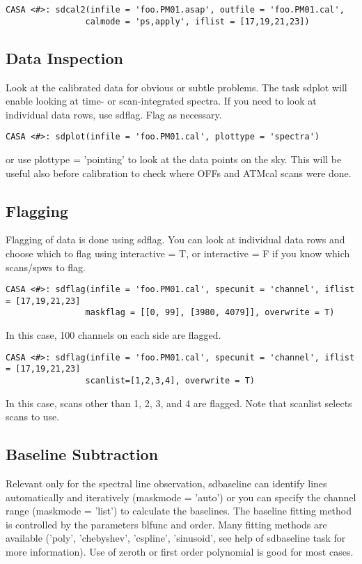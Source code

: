 \begin{verbatim}
CASA <#>: sdcal2(infile = 'foo.PM01.asap', outfile = 'foo.PM01.cal', 
                calmode = 'ps,apply', iflist = [17,19,21,23])
\end{verbatim}


\subsection{Data Inspection}
Look at the calibrated data for obvious or subtle problems. 
The task sdplot will enable looking at time- or scan-integrated spectra. 
If you need to look at individual data rows, use sdflag. Flag as 
necessary.

\begin{verbatim}
CASA <#>: sdplot(infile = 'foo.PM01.cal', plottype = 'spectra')
\end{verbatim}
or use plottype = 'pointing' to look at the data points on the sky. 
This will be useful also before calibration to check where OFFs and 
ATMcal scans were done. 


\subsection{Flagging}

Flagging of data is done using sdflag. 
You can look at individual data rows and choose which to flag using 
interactive = T, or interactive = F if you know which scans/spws to flag.

\begin{verbatim}
CASA <#>: sdflag(infile = 'foo.PM01.cal', specunit = 'channel', iflist 
= [17,19,21,23]
                maskflag = [[0, 99], [3980, 4079]], overwrite = T)
\end{verbatim}
In this case, 100 channels on each side are flagged. 

\begin{verbatim}
CASA <#>: sdflag(infile = 'foo.PM01.cal', specunit = 'channel', iflist 
= [17,19,21,23]
                scanlist=[1,2,3,4], overwrite = T)
\end{verbatim}
In this case, scans other than 1, 2, 3, and 4 are flagged. Note that 
scanlist selects scans to use. 


\subsection{Baseline Subtraction}
\label{section:sd.sdguide.baseline}
Relevant only for the spectral line observation, sdbaseline can identify 
lines automatically and iteratively (maskmode = 'auto') or you can 
specify the channel range (maskmode = 'list') to calculate the baselines. 
The baseline fitting method is controlled by the parameters blfunc and 
order. 
Many fitting methods are available ('poly', 'chebyshev', 'cspline', 
'sinusoid', see help of sdbaseline task for more information). 
Use of zeroth or first order polynomial is good for most cases. 


